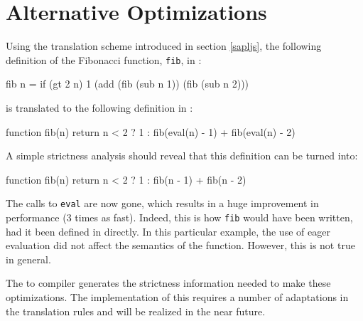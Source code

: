 \section{Alternative Optimizations}
\label{sapljs:sec:optimizations}

Using the translation scheme introduced in section \ref{sapljs}, the following 
definition of the Fibonacci function, \texttt{fib}, in \Sapl:
\begin{CleanCode}
fib n = if (gt 2 n) 1 (add (fib (sub n 1)) (fib (sub n 2)))
\end{CleanCode} 
is translated to the following definition in \JS:
\begin{CleanCode}
function fib(n) {
    return n < 2 ? 1 : fib(eval(n) - 1) + fib(eval(n) - 2)
}
\end{CleanCode}
A simple strictness analysis should reveal that this definition can be turned into:
\begin{CleanCode}
function fib(n) {
    return n < 2 ? 1 : fib(n - 1) + fib(n - 2)
}
\end{CleanCode}
The calls to \texttt{eval} are now gone, which results in a huge improvement in performance (3 times as fast). Indeed,
this is how \texttt{fib} would have been written, had it been defined in \JavaScript
directly. In this particular example, the use of eager evaluation did not affect
the semantics of the function. However, this is not true in general. 

The \Clean to \Sapl compiler generates the strictness information needed to make these 
optimizations. The implementation of this requires a number of adaptations in the translation rules
and will be realized in the near future.

